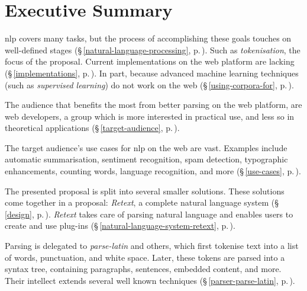 
\begingroup
\let\clearpage\relax
\let\cleardoublepage\relax
\let\cleardoublepage\relax

\chapter*{Executive Summary}

\gls{nlp} covers many tasks, but the process of accomplishing
  these goals touches on well-defined stages
  (§\,\ref{natural-language-processing},
  p.\,\pageref{natural-language-processing}).
Such as \emph{tokenisation}, the focus of the proposal.
Current implementations on the web platform are lacking
  (§\,\ref{implementations}, p.\,\pageref{implementations}).
In part, because advanced machine learning techniques (such as
  \emph{supervised learning}) do not work on the web
  (§\,\ref{using-corpora-for}, p.\,\pageref{using-corpora-for}).

The audience that benefits the most from better parsing on the web platform,
  are web developers, a group which is more interested in practical use, and
  less so in theoretical applications
  (§\,\ref{target-audience}, p.\,\pageref{target-audience}).

The target audience's use cases for \gls{nlp} on the web are vast. Examples
  include automatic summarisation, sentiment recognition, spam detection,
  typographic enhancements, counting words, language recognition, and more
  (§\,\ref{use-cases}, p.\,\pageref{use-cases}).

The presented proposal is split into several smaller solutions.
These solutions come together in a proposal: \emph{Retext}, a complete
  natural language system (§\,\ref{design}, p.\,\pageref{design}).
\emph{Retext} takes care of parsing natural language and enables users to
  create and use plug-ins (§\,\ref{natural-language-system-retext},
  p.\,\pageref{natural-language-system-retext}).

Parsing is delegated to \emph{parse-latin} and others, which first tokenise
  text into a list of words, punctuation, and white space. Later, these
  tokens are parsed into a syntax tree, containing paragraphs, sentences,
  embedded content, and more. Their intellect extends several well known
  techniques (§\,\ref{parser-parse-latin}, p.\,\pageref{parser-parse-latin}).

